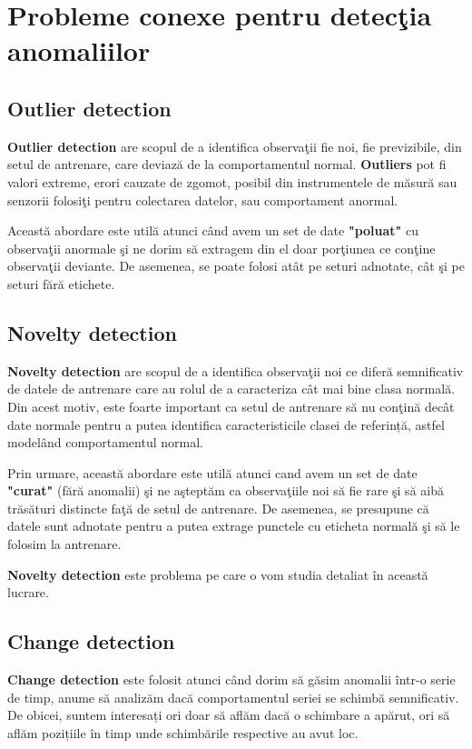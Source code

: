 \section{Probleme conexe pentru detecţia anomaliilor}

\subsection{Outlier detection}

\textbf{Outlier detection} are scopul de a identifica observaţii fie noi,
fie previzibile, din setul de antrenare, care deviază de la 
comportamentul normal. 
\textbf{Outliers} pot fi valori extreme, erori cauzate 
de zgomot, posibil din instrumentele de măsură sau senzorii folosiţi 
pentru colectarea datelor, sau comportament anormal.

Această abordare este utilă atunci când avem un set de date \textbf{"poluat"} cu 
observaţii anormale şi ne dorim să extragem din el doar porţiunea ce conţine 
observaţii deviante. De asemenea, se poate folosi atât pe seturi adnotate, cât 
şi pe seturi fără etichete.

\subsection{Novelty detection}

\textbf{Novelty detection} are scopul de a identifica observaţii noi 
ce diferă semnificativ de datele de antrenare care au rolul de a 
caracteriza cât mai bine clasa normală. Din acest motiv, este foarte 
important ca setul de antrenare să nu conţină
decât date normale pentru a putea identifica caracteristicile clasei de referință,
astfel modelând comportamentul normal.

Prin urmare, această abordare este utilă atunci cand avem un 
set de date \textbf{"curat"} (fără 
anomalii) şi ne aşteptăm ca observaţiile noi să fie rare şi să aibă trăsături
distincte faţă de setul de antrenare. De asemenea, se presupune că datele sunt adnotate 
pentru a putea extrage punctele cu eticheta normală şi să le folosim la antrenare.

\textbf{Novelty detection} este problema pe care o vom studia detaliat în 
această lucrare.

\subsection{Change detection}

\textbf{Change detection} este folosit atunci când dorim să găsim anomalii 
într-o serie de timp, anume să analizăm dacă 
comportamentul seriei se schimbă semnificativ. De obicei, suntem interesați 
ori doar să aflăm dacă o schimbare a apărut, ori să aflăm pozițiile 
în timp unde schimbările respective au avut loc.

